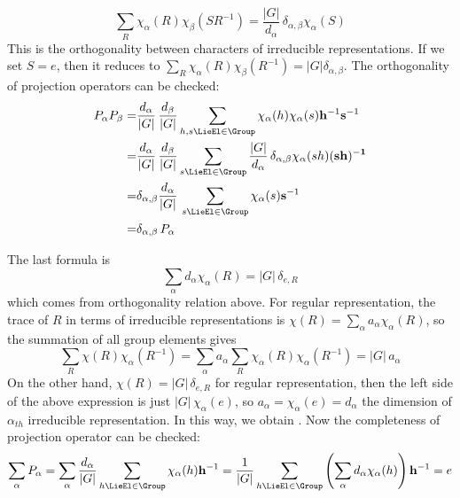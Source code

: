 \begin{description}
\begin{equation}
\sum_{R}\chi_\alpha(R) \chi_\beta(SR^{-1})=\frac{|G|}{d_\alpha}\,
\delta _{\alpha,\beta} \chi_\alpha(S)
\end{equation}
This is the orthogonality between characters of irreducible
representations. If we set $S=e$, then it reduces to
$\sum_{R}\chi_\alpha(R) \chi_\beta(R^{-1})=|G|\delta _{\alpha,\beta}$.
The orthogonality of projection operators can be checked:
\begin{align*}
  P_\alpha P_\beta = & \frac{d_\alpha}{|G|}\, \frac{d_\beta}{|G|}
  \sum_{h,s\LieEl\in\Group} \chi_\alpha (h) \chi_\alpha (s) {\bf h}^{-1} {\bf s}^{-1} \\
  = & \frac{d_\alpha}{|G|}\, \frac{d_\beta}{|G|} \sum_{s\LieEl\in\Group}
  \frac{|G|}{d_\alpha}\,\delta _{\alpha,\beta} \chi_\alpha(sh)(\bf{sh})^{-1} \\
  = &\delta _{\alpha,\beta} \frac{d_\alpha}{|G|}\,\sum_{s\LieEl\in\Group}
  \chi_\alpha(s){\bf s}^{-1} \\
  = & \delta _{\alpha,\beta}\, P_\alpha
\end{align*}

The last formula is
\begin{equation}
\sum_\alpha d_\alpha \chi_\alpha (R) = |G|\, \delta_{e,R}
\label{eq:groupcomplete}
\end{equation}
which comes from orthogonality relation above. For regular representation,
the trace of $R$ in terms of irreducible representations is
$\chi (R)=\sum_\alpha a_\alpha \chi_\alpha (R)$, so the summation of all group
elements gives
\[
\sum_{R}\chi (R)\chi_\alpha (R^{-1})=\sum_\alpha a_\alpha \sum_{R}
\chi_\alpha (R) \chi_\alpha (R^{-1}) =|G|\, a_\alpha
\]
On the other hand, $\chi (R)=|G|\, \delta_{e,R}$ for regular representation,
then the left side of the above expression is just $|G|\,\chi_\alpha (e)$,
so $a_\alpha =\chi_\alpha (e) =d_\alpha $ the dimension of $\alpha_{th}$
irreducible representation. In this way, we obtain .
Now the completeness of projection operator can be checked:
\[
\sum_\alpha P_\alpha = \sum_\alpha \frac{d_\alpha}{|G|} \sum_{h\LieEl\in\Group}
  \chi_\alpha (h)  {\bf h}^{-1}
 =\frac{1}{|G|} \sum_{h\LieEl\in\Group} \left(\sum_\alpha d_\alpha \chi_\alpha (h)
   \right){\bf h}^{-1}
=e
\]


\end{description}
